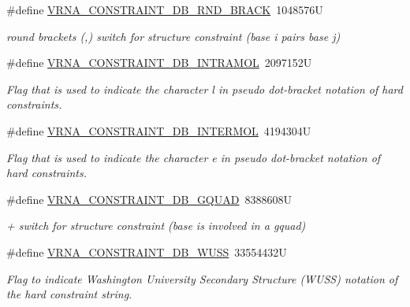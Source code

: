 \begin{DoxyCompactItemize}
\#define \hyperlink{group__hard__constraints_gac17b034852c914bc5879954c65d7e74b}{V\+R\+N\+A\+\_\+\+C\+O\+N\+S\+T\+R\+A\+I\+N\+T\+\_\+\+D\+B\+\_\+\+R\+N\+D\+\_\+\+B\+R\+A\+CK}~1048576U
\begin{DoxyCompactList}\small\item\em round brackets \textquotesingle{}(\textquotesingle{},\textquotesingle{})\textquotesingle{} switch for structure constraint (base i pairs base j) \end{DoxyCompactList}\item 
\#define \hyperlink{group__hard__constraints_ga5c17253f5a39d1d49b0fb11f5196982a}{V\+R\+N\+A\+\_\+\+C\+O\+N\+S\+T\+R\+A\+I\+N\+T\+\_\+\+D\+B\+\_\+\+I\+N\+T\+R\+A\+M\+OL}~2097152U
\begin{DoxyCompactList}\small\item\em Flag that is used to indicate the character \textquotesingle{}l\textquotesingle{} in pseudo dot-\/bracket notation of hard constraints. \end{DoxyCompactList}\item 
\#define \hyperlink{group__hard__constraints_ga31d0ebb9755ca8a4acafc14f00ca755d}{V\+R\+N\+A\+\_\+\+C\+O\+N\+S\+T\+R\+A\+I\+N\+T\+\_\+\+D\+B\+\_\+\+I\+N\+T\+E\+R\+M\+OL}~4194304U
\begin{DoxyCompactList}\small\item\em Flag that is used to indicate the character \textquotesingle{}e\textquotesingle{} in pseudo dot-\/bracket notation of hard constraints. \end{DoxyCompactList}\item 
\#define \hyperlink{group__hard__constraints_ga75cfab03cdc97c95b3ce8bb29f52b08e}{V\+R\+N\+A\+\_\+\+C\+O\+N\+S\+T\+R\+A\+I\+N\+T\+\_\+\+D\+B\+\_\+\+G\+Q\+U\+AD}~8388608U
\begin{DoxyCompactList}\small\item\em \textquotesingle{}+\textquotesingle{} switch for structure constraint (base is involved in a gquad) \end{DoxyCompactList}\item 
\#define \hyperlink{group__hard__constraints_ga10ce6bd2355945f3c8161b7a30a2c322}{V\+R\+N\+A\+\_\+\+C\+O\+N\+S\+T\+R\+A\+I\+N\+T\+\_\+\+D\+B\+\_\+\+W\+U\+SS}~33554432U
\begin{DoxyCompactList}\small\item\em Flag to indicate Washington University Secondary Structure (W\+U\+SS) notation of the hard constraint string. \end{DoxyCompactList}\item 

\end{DoxyCompactItemize}
